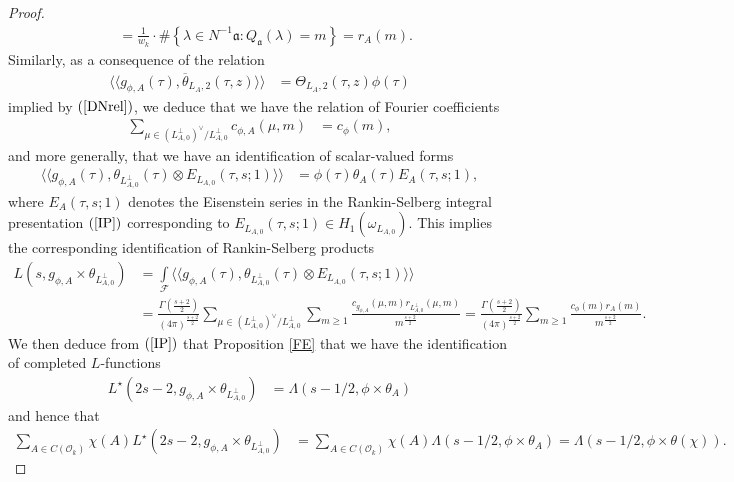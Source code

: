 \documentclass{amsart}
\theoremstyle{definition}
\theoremstyle{definition}
\theoremstyle{definition}
\begin{document}
\begin{proof}
\begin{align*}
&= \frac{1}{w_k} \cdot \# \left\lbrace \lambda \in N^{-1} \mathfrak{a}: Q_{\mathfrak{a}}(\lambda) = m \right\rbrace = r_A(m). \end{align*}
Similarly, as a consequence of the relation
\begin{align*}\langle \langle g_{\phi, A}(\tau), \overline{\theta}_{L_A, 2}(\tau, z) \rangle \rangle 
&= \Theta_{L_A, 2}(\tau, z) \phi (\tau) \end{align*}
implied by $(\ref{DNrel})$, we deduce that we have the relation of Fourier coefficients 
\begin{align*} \sum\limits_{ \mu \in (L_{A,0}^{\perp})^{\vee} / L_{A,0}^{\perp} } c_{\phi, A}(\mu, m) &= c_{\phi}(m), \end{align*}
and more generally, that we have an identification of scalar-valued forms 
\begin{align*} \langle \langle g_{\phi, A}(\tau), \theta_{L_{A,0}^{\perp}}(\tau) \otimes E_{L_{A,0}}(\tau, s; 1) \rangle \rangle
&= \phi (\tau) \theta_A(\tau) E_A(\tau, s; 1), \end{align*}
where $E_{A}(\tau, s; 1)$ denotes the Eisenstein series in the Rankin-Selberg integral presentation $(\ref{IP})$
corresponding to $E_{L_{A,0}}(\tau, s; 1) \in H_1(\omega_{L_{A,0}})$.
This implies the corresponding identification of Rankin-Selberg products 
\begin{equation*}\begin{aligned} L(s, g_{\phi, A} \times \theta_{L_{A,0}^{\perp}}) 
&= \int\limits_{\mathcal{F}} \langle \langle g_{\phi, A}(\tau), \theta_{L_{A,0}^{\perp}}(\tau) \otimes E_{L_{A,0}}(\tau, s; 1) \rangle \rangle \\
&= \frac{ \Gamma \left( \frac{s+2}{2} \right)  }{ (4 \pi)^{ \frac{s+2}{2}  } }
\sum\limits_{ \mu \in (L_{A,0}^{\perp})^{\vee} / L_{A,0}^{\perp} } \sum\limits_{m \geq 1} 
\frac{  c_{g_{\phi, A}}(\mu, m) r_{ L_{A,0}^{\perp} }(\mu, m) }{ m^{ \frac{s+2}{2} } } =  \frac{ \Gamma \left( \frac{s+2}{2} \right)  }{ (4 \pi)^{ \frac{s+2}{2}  } }
\sum\limits_{m \geq 1} \frac{  c_{\phi}(m) r_A(m) }{ m^{\frac{s+2}{2}} }. \end{aligned}\end{equation*}
We then deduce from $(\ref{IP})$ that Proposition \ref{FE} that we have the identification of completed $L$-functions
\begin{align*} L^{\star}(2s-2, g_{\phi, A} \times \theta_{L_{A,0}^{\perp}}) 
&= \Lambda(s-1/2, \phi \times \theta_A) \end{align*}
and hence that 
\begin{align*} \sum_{A \in C(\mathcal{O}_k)} \chi(A) L^{\star}(2s-2, g_{\phi, A} \times \theta_{L_{A,0}^{\perp}}) &= 
\sum_{A \in C(\mathcal{O}_k)} \chi(A) \Lambda(s-1/2, \phi \times \theta_A) = \Lambda(s-1/2, \phi \times \theta(\chi)). \end{align*}


\end{proof}
\end{document}
